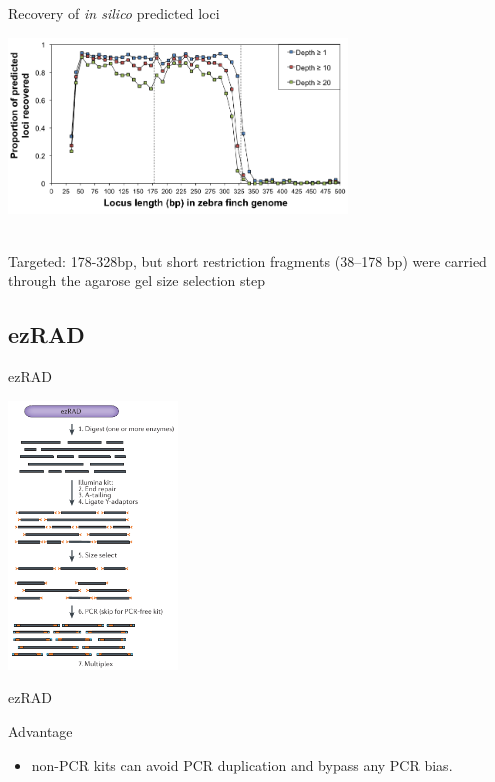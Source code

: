 \documentclass[presentation]{beamer}
\begin{document}
\begin{frame}[label=sec-2-2-7]{Recovery of \emph{in silico} predicted loci}
\begin{center}
\includegraphics[width=9cm]{DaCosta2014Fig1a.png}

 \tiny{\citep{Dacosta2014}}\\
\small{Targeted: 178-328bp, but short restriction fragments (38–178 bp) were carried through the agarose gel size selection step}
 \end{center}
\end{frame}

\subsection{ezRAD}
\label{sec-2-3}

\begin{frame}[label=sec-2-3-1]{ezRAD \citep{Toonen2013}}
\begin{center}
\includegraphics[width=4.5cm]{Andrews2016ezRAD.png}


\tiny{\citep{Andrews2016}}
\end{center}
\end{frame}
\begin{frame}[label=sec-2-3-2]{ezRAD \citep{Toonen2013}}
\begin{block}{Advantage}
\begin{itemize}
\item non-PCR kits can avoid PCR duplication and bypass any PCR bias.
\end{itemize}
\end{block}
\end{frame}
\end{document}

